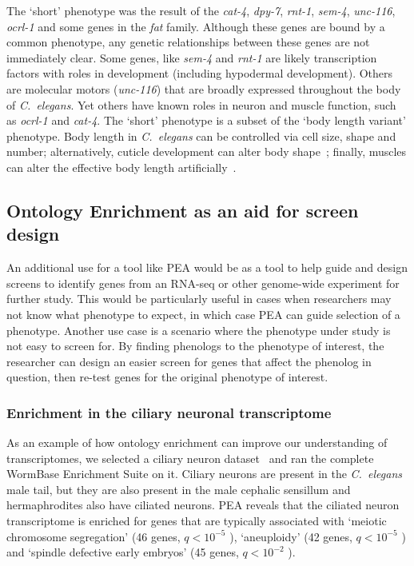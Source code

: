 \documentclass[10pt,letterpaper,twocolumn]{article}
\newcommand{\cel}{\emph{C.~elegans}}
\newcommand{\qval}[1]{
                      \ensuremath{
                                  q<10^{-#1}
                                  }
                      }
\begin{document}
The `short' phenotype was the result of the \emph{cat-4}, \emph{dpy-7},
\emph{rnt-1}, \emph{sem-4}, \emph{unc-116}, \emph{ocrl-1} and some genes in the
\emph{fat} family. Although these genes are bound by a common phenotype, any
genetic relationships between these genes are not immediately clear. Some genes,
like \emph{sem-4} and \emph{rnt-1} are likely transcription factors with roles
in development (including hypodermal development).
Others are molecular motors (\emph{unc-116}) that are broadly expressed throughout
the body of \cel{}. Yet others have known roles in neuron and muscle function,
such as \emph{ocrl-1} and \emph{cat-4}. The `short' phenotype is a subset of
the `body length variant' phenotype. Body length in \cel{} can be controlled via
cell size, shape and number\cite{}; alternatively, cuticle development can alter body
shape~\cite{}; finally, muscles can alter the effective body length artificially~\cite{}.



\subsection*{Ontology Enrichment as an aid for screen design}
An additional use for a tool like PEA would be as a tool to help guide and
design screens to identify genes from an RNA-seq or other genome-wide experiment
for further study. This would be particularly useful in cases when researchers
may not know what phenotype to expect, in which case PEA can guide selection of
a phenotype. Another use case is a scenario where the phenotype under study is
not easy to screen for. By finding phenologs to the phenotype of interest, the
researcher can design an easier screen for genes that affect the phenolog in
question, then re-test genes for the original phenotype of interest.

\subsubsection*{Enrichment in the ciliary neuronal transcriptome}
As an example of how ontology enrichment can improve our understanding of
transcriptomes,
we selected a ciliary neuron dataset~\cite{} and ran the complete WormBase
Enrichment Suite on it. Ciliary neurons are present in the \cel{} male tail, but
they are also present in the male cephalic sensillum and hermaphrodites also have
ciliated neurons. PEA reveals that the ciliated
neuron transcriptome is enriched for genes that are typically associated with
`meiotic chromosome segregation' (46 genes, \qval{5}),
`aneuploidy' (42 genes, \qval{5}) and `spindle defective early embryos' (45
genes, \qval{2}).
\end{document}
